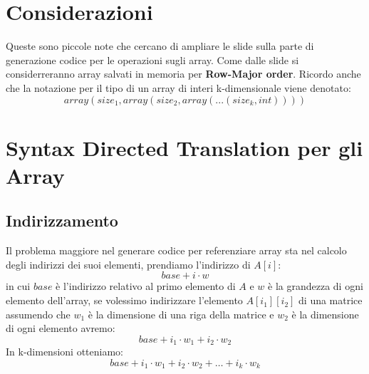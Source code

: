 \documentclass[11pt]{article}
\begin{document}
\section{Considerazioni}
Queste sono piccole note che cercano di ampliare le slide sulla parte 
di generazione codice per le operazioni sugli array. Come dalle slide
si considerreranno array salvati in memoria per \textbf{Row-Major order}.
Ricordo anche che la notazione per il tipo di un array di interi k-dimensionale viene 
denotato:
$$array(size_1, array(size_2, array(...(size_k, int))))$$
\section{Syntax Directed Translation per gli Array}
\subsection{Indirizzamento}
Il problema maggiore nel generare codice per referenziare array sta nel
calcolo degli indirizzi dei suoi elementi, prendiamo l'indirizzo di $A[i]$:
$$base + i \cdot w$$
in cui $base$ è l'indirizzo relativo al primo elemento di $A$ e $w$ è la 
grandezza di ogni elemento dell'array, se volessimo indirizzare l'elemento 
$A[i_1][i_2]$ di una matrice assumendo che $w_1$ è la dimensione di una riga della matrice  e $w_2$ è la dimensione di ogni elemento avremo:
$$base + i_1 \cdot w_1 + i_2 \cdot w_2 $$
In k-dimensioni otteniamo:
\begin{equation} \label{eq:sum-offset}
  base + i_1\cdot w_1 + i_2 \cdot w_2 + \dots + i_k \cdot w_k
\end{equation}
\end{document}

